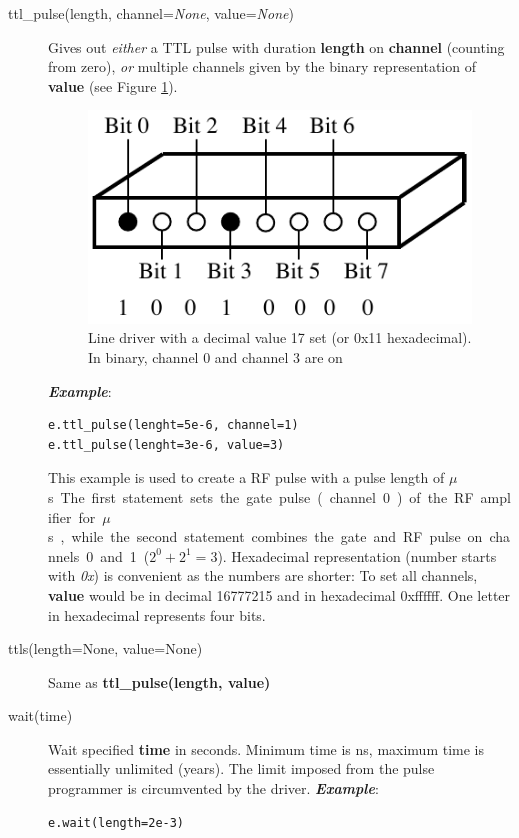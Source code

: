 \documentclass[12pt, a4paper, BCOR10mm, twoside, titlepage, headinclude]{scrbook}
\begin{document}
\begin{description}

\item[ttl\_pulse(length, channel=\textit{None}, value=\textit{None})]
Gives out \emph{either} a \textsf{TTL} pulse with duration \textbf{length} on \textbf{channel} (counting from zero), \emph{or} multiple channels given by the binary representation of \textbf{value} (see Figure \ref{binary}).
\begin{figure}
\centering
\includegraphics[]{pins_ttl_bit}
\caption{Line driver with a decimal value 17 set (or 0x11 hexadecimal). In binary, channel 0 and channel 3 are on}
\label{binary}
\end{figure}


\emph{\textbf{Example}}:
\begin{lstlisting}
e.ttl_pulse(lenght=5e-6, channel=1)
e.ttl_pulse(lenght=3e-6, value=3)
\end{lstlisting}
This example is used to create a RF pulse with a pulse length of \unit[3]{$\mu$s}. The first statement sets the gate pulse (channel 0) of the RF amplifier for \unit[5]{$\mu$s}, while the second  statement combines the gate and RF pulse on channels 0 and 1 ($2^0 + 2^1 = 3$). Hexadecimal representation (number starts with \emph{0x}) is convenient as the numbers are shorter: To set all channels, \textbf{value} would be in decimal 16777215 and in hexadecimal 0xffffff. One letter in hexadecimal represents four bits.

\item[ttls(length=None, value=None)]
Same as \textbf{ttl\_pulse(length, value)}

\item[wait(time)]
Wait specified \textbf{time} in seconds. Minimum time is \unit[90]{ns}, maximum time is essentially  unlimited (years). The limit imposed from the pulse programmer is circumvented by the driver.
\newline
\emph{\textbf{Example}}:
\begin{lstlisting}
e.wait(length=2e-3)
\end{lstlisting}


\end{description}
\end{document}
